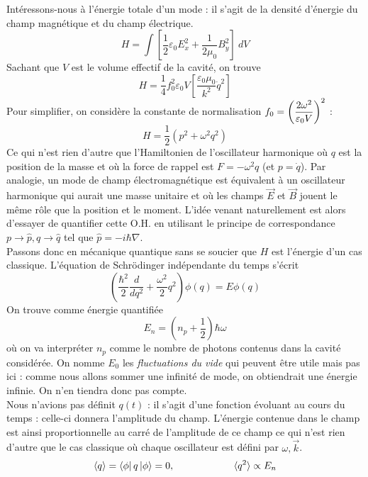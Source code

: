 	Intéressons-nous à l'énergie totale d'un mode : il s'agit de la densité d'énergie du champ magnétique 
	et du champ électrique. 
	\begin{equation}
	H = \int\left[\frac{1}{2}\varepsilon_0E_x^2+\frac{1}{2\mu_0}B_y^2\right]\ dV
	\end{equation}
	Sachant que $V$ est le volume effectif de la cavité, on trouve
	\begin{equation}
	H = \frac{1}{4}f_0^2\varepsilon_0V\left[\dfrac{\varepsilon_0\mu_0}{k^2}\dot{q}^2\right]
	\end{equation}
	Pour simplifier, on considère la constante de normalisation $\displaystyle f_0=\left(\dfrac{2\omega^2}{
	\varepsilon_0V}\right)^2$ :
	\begin{equation}
	H = \frac{1}{2}(p^2+\omega^2q^2)
	\end{equation}
	Ce qui n'est rien d'autre que l'Hamiltonien de l'oscillateur harmonique où $q$ est la position de la 
	masse et où la force de rappel est $F=-\omega^2 q$ (et $p=\dot{q}$). Par analogie, un mode de champ 
	électromagnétique est équivalent à un oscillateur harmonique qui aurait une masse unitaire et où les 
	champs $\vec{E}$ et $\vec{B}$ jouent le même rôle que la position et le moment. L'idée venant 
	naturellement est alors d'essayer de quantifier cette O.H. en utilisant le principe de correspondance 
	$p\to\hat{p}, q\to\hat{q}$ tel que $\hat{p}=-i\hbar \nabla$. \\
	
	Passons donc en mécanique quantique sans se soucier que $H$ est l'énergie d'un cas classique. L'équation 
	de Schrödinger indépendante du temps s'écrit
	\begin{equation}
	\left(\dfrac{\hbar^2}{2}\dfrac{d}{dq^2}+\dfrac{\omega^2}{2}q^2\right)\phi(q) = E\phi(q)
	\end{equation}
	On trouve comme énergie quantifiée
	\begin{equation}
	E_n = \left(n_p+\dfrac{1}{2}\right)\hbar\omega
	\end{equation}
	où on va interpréter $n_p$ comme le nombre de photons contenus dans la cavité considérée. On nomme 
	$E_0$ les \textit{fluctuations du vide} qui peuvent être utile mais pas ici : comme nous allons 
	sommer une infinité de mode, on obtiendrait une énergie infinie. On n'en tiendra donc pas compte.\\
	
	Nous n'avions pas définit $q(t)$ : il s'agit d'une fonction évoluant au cours du temps : celle-ci donnera 
	l'amplitude du champ. L'énergie contenue dans le champ est ainsi proportionnelle au carré de l'amplitude 
	de ce champ ce qui n'est rien d'autre que le cas classique où chaque oscillateur est défini par $\omega, 
	\vec{k}$.
	\begin{equation}
	\langle q\rangle = \bra{\phi}q\ket{\phi} = 0,\qquad\qquad\qquad \langle q^2\rangle\propto E_n
	\end{equation}
	
